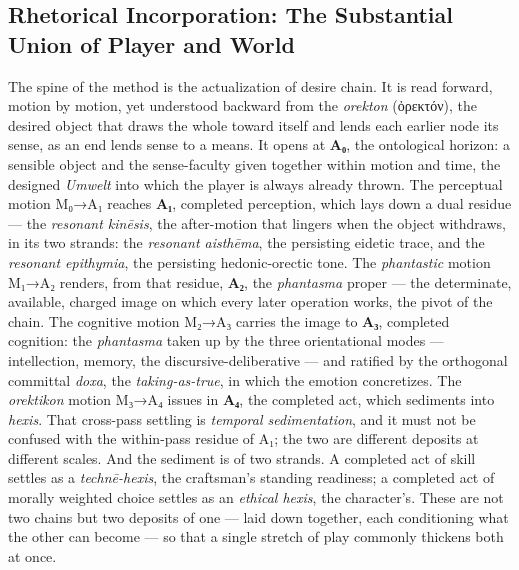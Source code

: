 \documentclass{article}
\newcommand{\gk}[1]{{\greekfont #1}}
\begin{document}
\subsection*{Rhetorical Incorporation: The Substantial Union of Player and World}

The spine of the method is the actualization of desire chain. It is read forward, motion by motion, yet understood backward from the \textit{orekton} (\gk{ὀρεκτόν}), the desired object that draws the whole toward itself and lends each earlier node its sense, as an end lends sense to a means. It opens at \textbf{A₀}, the ontological horizon: a sensible object and the sense-faculty given together within motion and time, the designed \textit{Umwelt} into which the player is always already thrown. The perceptual motion M₀→A₁ reaches \textbf{A₁}, completed perception, which lays down a dual residue — the \textit{resonant kinēsis}, the after-motion that lingers when the object withdraws, in its two strands: the \textit{resonant aisthēma}, the persisting eidetic trace, and the \textit{resonant epithymia}, the persisting hedonic-orectic tone. The \textit{phantastic} motion M₁→A₂ renders, from that residue, \textbf{A₂}, the \textit{phantasma} proper — the determinate, available, charged image on which every later operation works, the pivot of the chain. The cognitive motion M₂→A₃ carries the image to \textbf{A₃}, completed cognition: the \textit{phantasma} taken up by the three orientational modes — intellection, memory, the discursive-deliberative — and ratified by the orthogonal committal \textit{doxa}, the \textit{taking-as-true}, in which the emotion concretizes. The \textit{orektikon} motion M₃→A₄ issues in \textbf{A₄}, the completed act, which sediments into \textit{hexis}. That cross-pass settling is \textit{temporal sedimentation}, and it must not be confused with the within-pass residue of A₁; the two are different deposits at different scales. And the sediment is of two strands. A completed act of skill settles as a \textit{technē-hexis}, the craftsman's standing readiness; a completed act of morally weighted choice settles as an \textit{ethical hexis}, the character's. These are not two chains but two deposits of one — laid down together, each conditioning what the other can become — so that a single stretch of play commonly thickens both at once.
\end{document}
